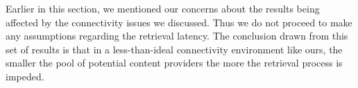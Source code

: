 Earlier in this section, we mentioned our concerns about the results being affected by the connectivity issues we discussed. Thus we do not proceed to make any assumptions regarding the retrieval latency. The conclusion drawn from this set of results is that in a less-than-ideal connectivity environment like ours, the smaller the pool of potential content providers the more the retrieval process is impeded.





















